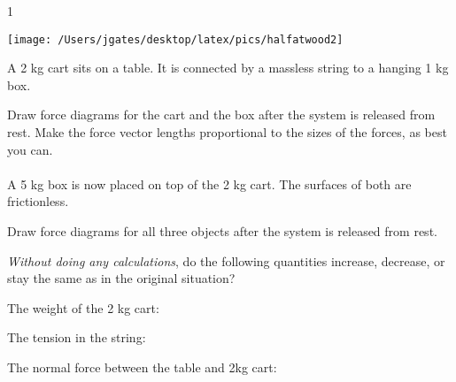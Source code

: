 
\AddToShipoutPicture*{\BackgroundPic}

\addtocounter {ProbNum} {1}

\begin{floatingfigure}[r]{.2\textwidth}
\texttt{[image: /Users/jgates/desktop/latex/pics/halfatwood2]}
\end{floatingfigure}
 
{\bf \Large{}} A 2 kg cart sits on a table. It is connected by a massless string to a hanging 1 kg box. 
 
\bigskip
Draw force diagrams for the cart and the box after the system is released from rest.  Make the force vector lengths proportional to the sizes of the forces, as best you can.\paragraph{}
\noindent
\vfill
A 5 kg box is now placed on top of the 2 kg cart.  The surfaces of both are frictionless.

Draw force diagrams for all three objects after the system is released from rest.

\vfill

\emph{Without doing any calculations}, do the following quantities increase, decrease, or stay the same as in the original situation?


The weight of the 2 kg cart: \framebox[.5cm][t]{\vphantom{.5cm} } 

\bigskip
The tension in the string: \framebox[.5cm][t]{\vphantom{.5cm} }
 
 \bigskip
The normal force between the table and 2kg cart: \framebox[.5cm][t]{\vphantom{.5cm} } 

\bigskip

\newpage